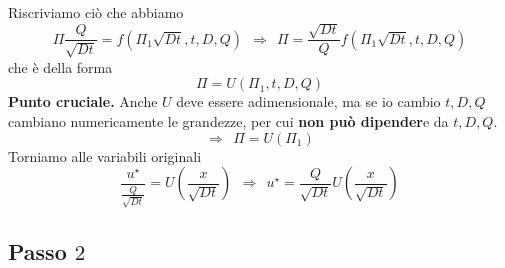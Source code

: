 \documentclass[10pt,a4paper,twoside,openright]{book}
\begin{document}
Riscriviamo ciò che abbiamo
\begin{equation*}
\Pi \frac{Q}{\sqrt{Dt}} =f\left( \Pi _{1}\sqrt{Dt},t,D,Q\right) \ \ \Rightarrow \ \ \Pi =\frac{\sqrt{Dt}}{Q} f\left( \Pi _{1}\sqrt{Dt},t,D,Q\right)
\end{equation*}
che è della forma
\begin{equation*}
\Pi =U(\Pi _{1},t,D,Q)
\end{equation*}
\textbf{Punto cruciale.} Anche $U$ deve essere adimensionale, ma se io cambio $t,D,Q$ cambiano numericamente le grandezze, per cui \textbf{non può dipender}e da $t,D,Q$.
\begin{equation*}
\Rightarrow \ \ \Pi =U(\Pi _{1})
\end{equation*}
Torniamo alle variabili originali
\begin{equation*}
\frac{u^{\star }}{\frac{Q}{\sqrt{Dt}}} =U\left(\frac{x}{\sqrt{Dt}}\right) \ \ \Rightarrow \ \ u^{\star } =\frac{Q}{\sqrt{Dt}} U\left(\frac{x}{\sqrt{Dt}}\right)
\end{equation*}
\subsection{Passo \texorpdfstring{$2$}{2}}
\end{document}
